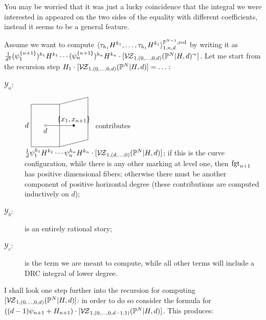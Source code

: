 You may be worried that it was just a lucky coincidence that the integral we were interested in appeared on the two sides of the equality with different coefficients, instead it seems to be a general feature.
\begin{rmk}
 Assume we want to compute $\langle\tau_{h_1}H^{k_1},\ldots,\tau_{h_1}H^{k_1}\rangle^{\mathbb P^{N-1},\rm{red}}_{1,n,d}$ by writing it as $\frac{1}{d^2}(\psi_1^{\{n+1\}})^{h_1}H^{k_1}\cdots(\psi_n^{\{n+1\}})^{h_n}H^{k_n}\cdot[\mathcal{V\!Z}_{1,(0,\ldots,0,d)}(\mathbb P^N|H,d)^\thicksim]$. Let me start from the recursion step $H_1\cdot[\mathcal{V\!Z}_{1,(0,\ldots,0,d)}(\mathbb P^N|H,d)]=\ldots:$
 
 \begin{description}
  \item[$\mathcal Y_a$:] $d\ {\tikz[baseline=-3pt,scale=.7]{
\draw (2,0) node[above]{$\{x_1,x_{n+1}\}$} -- (0,0)node[below]{$d$};
\draw (2,0) circle(2pt)[fill=black];
\draw (0,0) circle(2pt)[fill=white];
\draw (-1,1.5) -- (1,1.5) -- (1,-1.5) -- (-1,-1.5) -- (-1,1.5);
\draw (1,1.5) -- (3,2) -- (3,-1) -- (1,-1.5);
}}$ contributes $\frac{1}{d}\psi_1^{h_1}H^{k_1}\cdots\psi_n^{h_n}H^{k_n}\cdot[\mathcal{V\!Z}_{1,(d,\ldots,0)}(\mathbb P^N|H,d)]$; if this is the curve configuration, while there is any other marking at level one, then $\operatorname{fgt}_{n+1}$ has positive dimensional fibers; otherwise there must be another component of positive horizontal degree (these contributions are computed inductively on $d$);
\item[$\mathcal Y_b$:] is an entirely rational story;
\item[$\mathcal Y_c$:] {} is the term we are meant to compute, while all other terms will include a DRC integral of lower degree.
 \end{description}
I shall look one step further into the recursion for computing $[\mathcal{V\!Z}_{1,(0,\ldots,0,d)}(\mathbb P^N|H,d)]$: in order to do so consider the formula for $((d-1)\psi_{n+1}+H_{n+1})\cdot[\mathcal{V\!Z}_{1,(0,\ldots,0,d-1,1)}(\mathbb P^N|H,d)]$. This produces:
\end{rmk}

